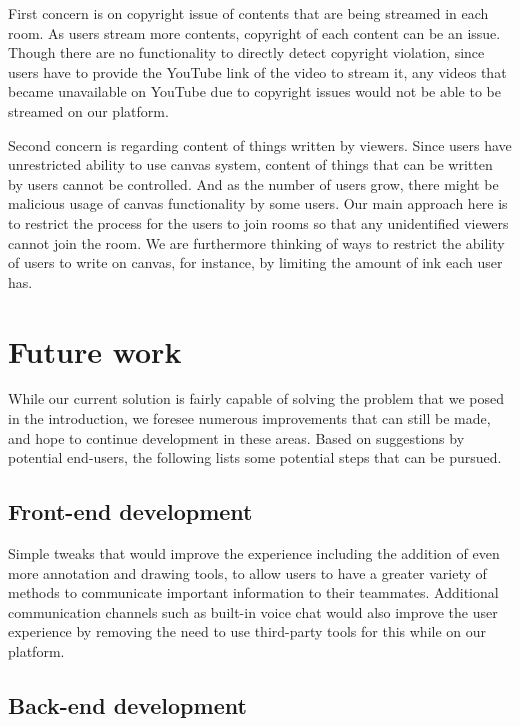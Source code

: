 \documentclass[conference]{IEEEtran}
\begin{document}
    First concern is on copyright issue of contents that are being streamed in each room. \cite{copyrightstream} As users stream more contents, copyright of each content can be an issue. Though there are no functionality to directly detect copyright violation, since users have to provide the YouTube link of the video to stream it, any videos that became unavailable on YouTube due to copyright issues would not be able to be streamed on our platform.

    Second concern is regarding content of things written by viewers. \cite{liabilitysite} Since users have unrestricted ability to use canvas system, content of things that can be written by users cannot be controlled. And as the number of users grow, there might be malicious usage of canvas functionality by some users. Our main approach here is to restrict the process for the users to join rooms so that any unidentified viewers cannot join the room. We are furthermore thinking of ways to restrict the ability of users to write on canvas, for instance, by limiting the amount of ink each user has.

\section{Future work}

    While our current solution is fairly capable of solving the problem that we posed in the introduction, we foresee numerous improvements that can still be made, and hope to continue development in these areas. Based on suggestions by potential end-users, the following lists some potential steps that can be pursued.

\subsection{Front-end development}

    Simple tweaks that would improve the experience including the addition of even more annotation and drawing tools, to allow users to have a greater variety of methods to communicate important information to their teammates. Additional communication channels such as built-in voice chat would also improve the user experience by removing the need to use third-party tools for this while on our platform.

\subsection{Back-end development}
\end{document}
